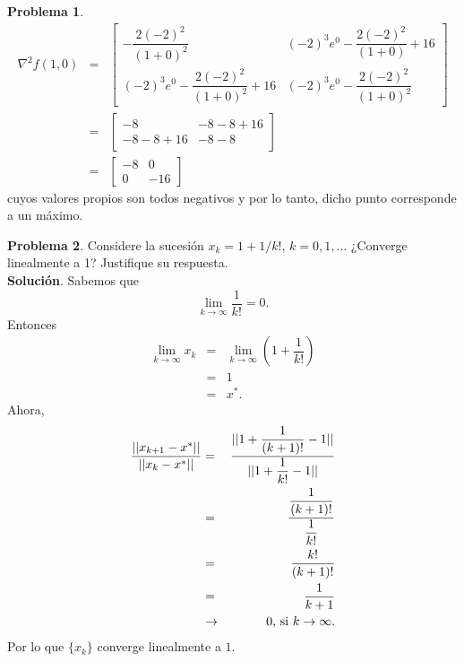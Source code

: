 \documentclass[12pt,letterpaper]{article}
\theoremstyle{definition}
\newtheorem{problm}{Problema}
\begin{document}
\begin{problm}
	\begin{eqnarray*}
		\nabla^2 f(1, 0) & = & \left[\begin{matrix}
									- \dfrac{2(-2)^2}{(1 + 0)^2} & (-2)^3 e^{0} - \dfrac{2(-2)^2}{(1 + 0)} + 16 \\
									(-2)^3 e^{0} - \dfrac{2(-2)^2}{(1 + 0)^2} + 16 & (-2)^3 e^{0} - \dfrac{2(-2)^2}{(1 + 0)^2}
								\end{matrix}\right] \\
					     & = & \left[\begin{matrix}
									- 8 & -8 - 8 + 16 \\
									-8 - 8 + 16 & -8 -8
								\end{matrix}\right] \\
						 & = & \left[\begin{matrix}
									- 8 & 0 \\
									0 & -16
								\end{matrix}\right]	
	\end{eqnarray*}
	cuyos valores propios son todos negativos y por lo tanto, dicho punto corresponde a un máximo. 
\end{problm}

\begin{problm}
	Considere la sucesión $ x_k = 1 + 1/k! $, $  k = 0,1,\dots $ ¿Converge linealmente a 1? Justifique su respuesta.
	\\
	\textbf{Solución}. Sabemos que 
	\[ \lim_{k \to \infty} \dfrac{1}{k!} = 0. \]
	Entonces
	\begin{eqnarray*}
		\lim_{k \to \infty} x_k & = & \lim_{k \to \infty} \left( 1 + \dfrac{1}{k!} \right) \\
							   & = & 1 \\
							   & = & x^*.  
	\end{eqnarray*}
	Ahora,
	\begin{eqnarray*}
		\dfrac{|| x_{k+1} - x^*||}{|| x_k - x^* ||} & = & \dfrac{|| 1 + \dfrac{1}{(k+1)!} - 1 ||}{|| 1 + \dfrac{1}{k!} - 1 ||} \\
													& = & \dfrac{ \dfrac{1}{(k+1)!}}{ \dfrac{1}{k!}} \\
													& = & \dfrac{k!}{ (k+1)!} \\
													& = & \dfrac{1}{k+1} \\
													& \to & 0 \textup{, si } k \to \infty.
	\end{eqnarray*}
	Por lo que $ \{x_k \} $ converge linealmente a $ 1 $.
\end{problm}
\end{document}
